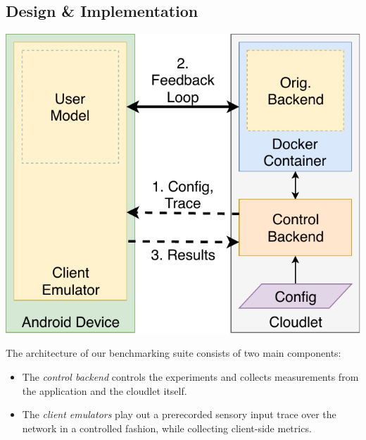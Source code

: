 \documentclass[portrait, a1]{KTHEEposter}
\begin{document}
\begin{pcolumns}[3]
\begin{pcolumn}[2]
\begin{pframe}[1]
                \section{Design \& Implementation}
                \begin{center}
                    \medskip
                    \includegraphics[width=\linewidth]{img/TraceReplay_GenArch}
                    \medskip
                \end{center}
                
                The architecture of our benchmarking suite consists of two main components:
                \begin{itemize}
                    \item The \emph{control backend} controls the experiments and collects measurements from the application and the cloudlet itself.
                    \item The \emph{client emulators} play out a prerecorded sensory input trace over the network in a controlled fashion, while collecting client-side metrics.
                \end{itemize}
            \end{pframe}
            \begin{pframe}[1]
                \begin{center}
                    \medskip
                    
                    \medskip
                \end{center}
            

\end{pframe}
\end{pcolumn}
\end{pcolumns}
\end{document}
